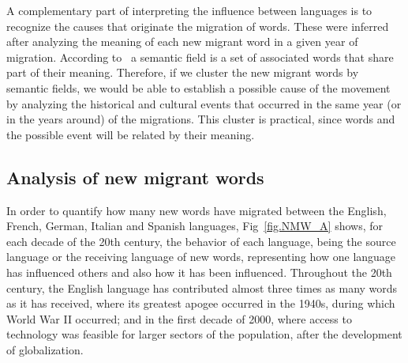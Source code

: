 \documentclass[10pt,letterpaper]{article} %
\begin{document}
	A complementary part of interpreting the influence between languages
	is to recognize the causes that originate the migration of words.  These were
	inferred after analyzing the meaning of each new migrant word in a given year
	of migration. According to~\cite{semantic_oxford} a semantic field is a set of
	associated words that share part of their meaning. Therefore, if we cluster the
	new migrant words  by semantic fields, we would be able to establish a possible
	cause of the movement by analyzing the historical and cultural events that
	occurred  in the same year (or in the years around) of the migrations. This
	cluster is practical, since words  and the possible event will be related by
	their meaning. 
	
	\subsection*{Analysis of new migrant words} %
	
	In order to quantify how many new words have migrated between the English,
	French, German, Italian and Spanish languages, Fig~\ref{fig.NMW_A} shows, for
	each decade of the 20th century, the behavior of each language, being the
	source language or the receiving language of new words, representing how one
	language has influenced others and also how it has been influenced. Throughout
	the 20th century, the English language has contributed almost three times as
	many words as it has received, where its greatest apogee occurred in the
	1940s, during which World War II occurred; and in the first decade of 2000,
	where access to technology was feasible for larger sectors of the population,
	after the development of globalization.
	
\end{document}
